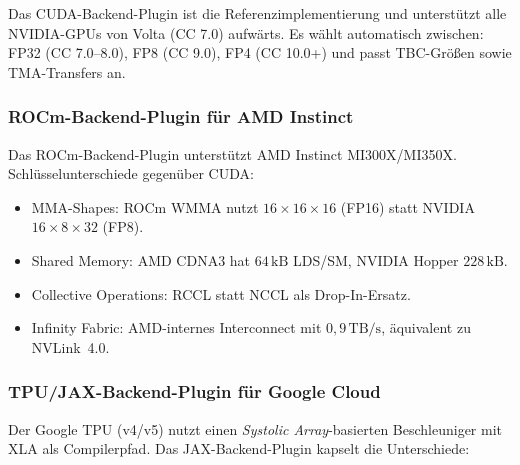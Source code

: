 ﻿\documentclass[12pt,a4paper]{article}
\begin{document}
Das CUDA-Backend-Plugin ist die Referenzimplementierung
und unterstützt alle NVIDIA-GPUs von Volta (CC 7.0)
aufwärts. Es wählt automatisch zwischen:
FP32 (CC 7.0--8.0), FP8 (CC 9.0), FP4 (CC 10.0+)
und passt TBC-Größen sowie TMA-Transfers an.

\subsubsection{ROCm-Backend-Plugin für AMD Instinct}

Das ROCm-Backend-Plugin unterstützt AMD Instinct MI300X/MI350X.
Schlüsselunterschiede gegenüber CUDA:

\begin{itemize}[leftmargin=1.4em, itemsep=1pt]
  \item MMA-Shapes: ROCm WMMA nutzt $16 \times 16 \times 16$ (FP16)
        statt NVIDIA $16 \times 8 \times 32$ (FP8).
  \item Shared Memory: AMD CDNA3 hat $64\,\text{kB}$ LDS/SM,
        NVIDIA Hopper $228\,\text{kB}$.
  \item Collective Operations: RCCL statt NCCL als Drop-In-Ersatz.
  \item Infinity Fabric: AMD-internes Interconnect mit
        $0{,}9\,\text{TB/s}$, äquivalent zu NVLink~4.0.
\end{itemize}

\subsubsection{TPU/JAX-Backend-Plugin für Google Cloud}

Der Google TPU (v4/v5) nutzt einen \emph{Systolic Array}-basierten
Beschleuniger mit XLA als Compilerpfad.
Das JAX-Backend-Plugin kapselt die Unterschiede:
\end{document}

